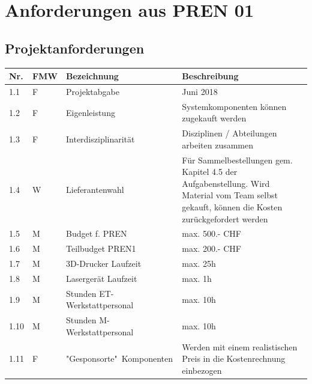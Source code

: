 \documentclass[a4paper]{report}
\begin{document}




\chapter{Anforderungen aus PREN 01}
\label{app:ch:Anforderungen}
\section{Projektanforderungen}
\label{app:sec:ProjektAnf}
\begin{tabular}{|p{}|p{}|p{}|p{}|}
	\hline
	\textbf{Nr.} & \textbf{FMW\footnotemark} & \textbf{Bezeichnung} & \textbf{Beschreibung} \\
	\hline
	1.1 & F & Projektabgabe & Juni 2018 \\
	\hline
	1.2 & F & Eigenleistung & Systemkomponenten können zugekauft werden \\
	\hline
	1.3 & F & Interdisziplinarität & Disziplinen / Abteilungen arbeiten zusammen \\
	\hline
	1.4 & W & Lieferantenwahl & Für Sammelbestellungen gem. Kapitel 4.5 der Aufgabenstellung. Wird Material vom Team selbst gekauft, können die Kosten zurückgefordert werden \\
	\hline
	1.5 & M & Budget f. PREN & max. 500.- CHF \\
	\hline
	1.6 & M & Teilbudget PREN1 & max. 200.- CHF \\
	\hline
	1.7 & M & 3D-Drucker Laufzeit & max. 25h \\
	\hline
	1.8 & M & Lasergerät Laufzeit & max. 1h \\
	\hline
	1.9 & M & Stunden ET-Werkstattpersonal & max. 10h \\
	\hline
	1.10 & M & Stunden M-Werkstattpersonal & max. 10h \\
	\hline
	1.11 & F & "Gesponsorte"\ Komponenten & Werden mit einem realistischen Preis in die Kostenrechnung einbezogen \\
	\hline
\end{tabular}
\end{document}
